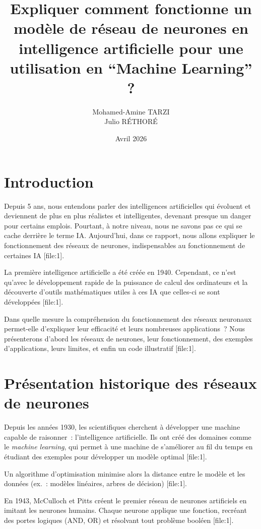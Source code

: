 \documentclass[12pt,a4paper]{article}
\title{Expliquer comment fonctionne un mod\`ele de r\'eseau de neurones en intelligence artificielle pour une utilisation en ``Machine Learning'' ?}
\author{Mohamed-Amine TARZI \\ Julio R\'ETHOR\'E}
\date{Avril 2026}
\begin{document}
\maketitle

\tableofcontents

\newpage

\section{Introduction}

Depuis 5 ans, nous entendons parler des intelligences artificielles qui \'evoluent et deviennent de plus en plus r\'ealistes et intelligentes, devenant presque un danger pour certains emplois. Pourtant, \`a notre niveau, nous ne savons pas ce qui se cache derri\`ere le terme IA. Aujourd'hui, dans ce rapport, nous allons expliquer le fonctionnement des r\'eseaux de neurones, indispensables au fonctionnement de certaines IA [file:1]. 

La premi\`ere intelligence artificielle a \'et\'e cr\'e\'ee en 1940. Cependant, ce n'est qu'avec le d\'eveloppement rapide de la puissance de calcul des ordinateurs et la d\'ecouverte d'outils math\'ematiques utiles \`a ces IA que celles-ci se sont d\'evelopp\'ees [file:1]. 

Dans quelle mesure la compr\'ehension du fonctionnement des r\'eseaux neuronaux permet-elle d'expliquer leur efficacit\'e et leurs nombreuses applications~? Nous pr\'esenterons d'abord les r\'eseaux de neurones, leur fonctionnement, des exemples d'applications, leurs limites, et enfin un code illustratif [file:1].

\section{Pr\'esentation historique des r\'eseaux de neurones}

Depuis les ann\'ees 1930, les scientifiques cherchent \`a d\'evelopper une machine capable de raisonner~: l'intelligence artificielle. Ils ont cr\'e\'e des domaines comme le \emph{machine learning}, qui permet \`a une machine de s'améliorer au fil du temps en \'etudiant des exemples pour d\'evelopper un mod\`ele optimal [file:1]. 

Un algorithme d'optimisation minimise alors la distance entre le mod\`ele et les donn\'ees (ex.~: mod\`eles lin\'eaires, arbres de d\'ecision) [file:1]. 

En 1943, McCulloch et Pitts cr\'eent le premier r\'eseau de neurones artificiels en imitant les neurones humains. Chaque neurone applique une fonction, recréant des portes logiques (AND, OR) et r\'esolvant tout probl\`eme bool\'een [file:1]. 
\end{document}
